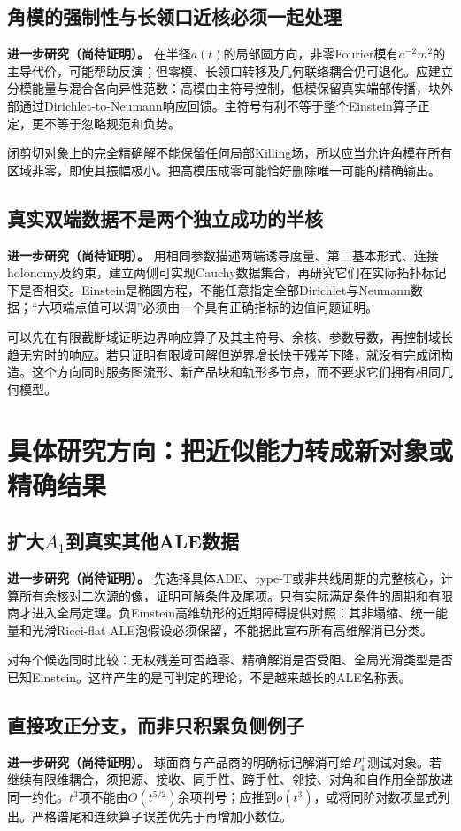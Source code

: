 \documentclass[UTF8,fontset=fandol,zihao=-4]{ctexart}
\theoremstyle{cn}
\newcommand{\newidea}{\par\noindent\textbf{进一步研究（尚待证明）。}}
\begin{document}
\subsection{角模的强制性与长领口近核必须一起处理}
\newidea
在半径$a(t)$的局部圆方向，非零Fourier模有$a^{-2}m^2$的主导代价，可能帮助反演；但零模、长领口转移及几何联络耦合仍可退化。应建立分模能量与混合各向异性范数：高模由主符号控制，低模保留真实端部传播，块外部通过Dirichlet-to-Neumann响应回馈。主符号有利不等于整个Einstein算子正定，更不等于忽略规范和负势。

闭剪切对象上的完全精确解不能保留任何局部Killing场，所以应当允许角模在所有区域非零，即使其振幅极小。把高模压成零可能恰好删除唯一可能的精确输出。

\subsection{真实双端数据不是两个独立成功的半核}
\newidea
用相同参数描述两端诱导度量、第二基本形式、连接holonomy及约束，建立两侧可实现Cauchy数据集合，再研究它们在实际拓扑标记下是否相交。Einstein是椭圆方程，不能任意指定全部Dirichlet与Neumann数据；“六项端点值可以调”必须由一个具有正确指标的边值问题证明。

可以先在有限截断域证明边界响应算子及其主符号、余核、参数导数，再控制域长趋无穷时的响应。若只证明有限域可解但逆界增长快于残差下降，就没有完成闭构造。这个方向同时服务图流形、新产品块和轨形多节点，而不要求它们拥有相同几何模型。

\section{具体研究方向：把近似能力转成新对象或精确结果}
\subsection{扩大\texorpdfstring{$A_1$}{A1}到真实其他ALE数据}
\newidea
先选择具体ADE、type-T或非共线周期的完整核心，计算所有余核对二次源的像，证明可解条件及尾项。只有实际满足条件的周期和有限商才进入全局定理。负Einstein高维轨形的近期障碍\cite{Yao}提供对照：其非塌缩、统一能量和光滑Ricci-flat ALE泡假设必须保留，不能据此宣布所有高维解消已分类。

对每个候选同时比较：无权残差可否趋零、精确解消是否受阻、全局光滑类型是否已知Einstein。这样产生的是可判定的理论，不是越来越长的ALE名称表。

\subsection{直接攻正分支，而非只积累负侧例子}
\newidea
球面商与产品商的明确标记解消可给$P_4^+$测试对象。若继续有限维耦合，须把源、接收、同手性、跨手性、邻接、对角和自作用全部放进同一约化。$t^3$项不能由$O(t^{5/2})$余项判号；应推到$o(t^3)$，或将同阶对数项显式列出。严格谱尾和连续算子误差优先于再增加小数位。
\end{document}
